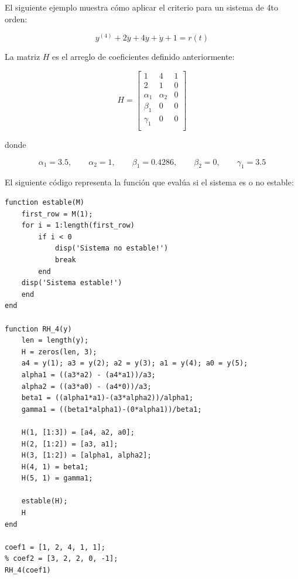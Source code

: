 El siguiente ejemplo muestra cómo aplicar el criterio para un sistema de 4to orden:

\begin{equation}
    y^{(4)} + 2\dddot{y} + 4\ddot{y} + \dot{y} + 1 = r(t)
\end{equation}

La matriz $H$ es el arreglo de coeficientes definido anteriormente:

\begin{equation*}
    H =
    \begin{bmatrix}
        1 & 4 & 1 \\
        2 & 1 & 0 \\
        \alpha_1 & \alpha_2 & 0 \\
        \beta_1 & 0 & 0 \\
        \gamma_1 & 0 & 0 \\
    \end{bmatrix}
\end{equation*}

\noindent donde 

\begin{equation*}
    \alpha_1 = 3.5, \qquad \alpha_2 = 1, \qquad \beta_1 = 0.4286, \qquad \beta_2 = 0, \qquad \gamma_1 = 3.5
\end{equation*}


El siguiente código representa la función que evalúa si el sistema es o no estable:


\begin{lstlisting}[caption = {Criterio de Routh aplicado al sistema de 4to orden}, label = {cod:3}]
function estable(M)
    first_row = M(1);
    for i = 1:length(first_row)
        if i < 0
            disp('Sistema no estable!')
            break
        end
    disp('Sistema estable!')
    end
end

function RH_4(y)
    len = length(y);
    H = zeros(len, 3);
    a4 = y(1); a3 = y(2); a2 = y(3); a1 = y(4); a0 = y(5);
    alpha1 = ((a3*a2) - (a4*a1))/a3;
    alpha2 = ((a3*a0) - (a4*0))/a3;
    beta1 = ((alpha1*a1)-(a3*alpha2))/alpha1;
    gamma1 = ((beta1*alpha1)-(0*alpha1))/beta1;

    H(1, [1:3]) = [a4, a2, a0];
    H(2, [1:2]) = [a3, a1];
    H(3, [1:2]) = [alpha1, alpha2];
    H(4, 1) = beta1;
    H(5, 1) = gamma1;
    
    estable(H);
    H
end

coef1 = [1, 2, 4, 1, 1];
% coef2 = [3, 2, 2, 0, -1];
RH_4(coef1)

\end{lstlisting}



